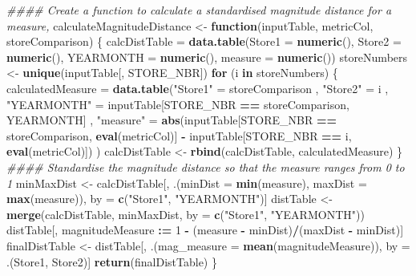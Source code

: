 \documentclass[
]{article}
\newenvironment{Shaded}{\begin{snugshade}}{\end{snugshade}}
\newcommand{\CommentTok}[1]{\textcolor[rgb]{0.56,0.35,0.01}{\textit{#1}}}
\newcommand{\ControlFlowTok}[1]{\textcolor[rgb]{0.13,0.29,0.53}{\textbf{#1}}}
\newcommand{\DataTypeTok}[1]{\textcolor[rgb]{0.13,0.29,0.53}{#1}}
\newcommand{\DecValTok}[1]{\textcolor[rgb]{0.00,0.00,0.81}{#1}}
\newcommand{\ErrorTok}[1]{\textcolor[rgb]{0.64,0.00,0.00}{\textbf{#1}}}
\newcommand{\KeywordTok}[1]{\textcolor[rgb]{0.13,0.29,0.53}{\textbf{#1}}}
\newcommand{\NormalTok}[1]{#1}
\newcommand{\OperatorTok}[1]{\textcolor[rgb]{0.81,0.36,0.00}{\textbf{#1}}}
\newcommand{\StringTok}[1]{\textcolor[rgb]{0.31,0.60,0.02}{#1}}
\begin{document}
\begin{Shaded}
\begin{Highlighting}[]
{{{\CommentTok{#### Create a function to calculate a standardised magnitude distance for a measure,}
\NormalTok{calculateMagnitudeDistance <-}\StringTok{ }\ControlFlowTok{function}\NormalTok{(inputTable, metricCol, storeComparison) \{}
\NormalTok{  calcDistTable =}\StringTok{ }\KeywordTok{data.table}\NormalTok{(}\DataTypeTok{Store1 =} \KeywordTok{numeric}\NormalTok{(), }\DataTypeTok{Store2 =} \KeywordTok{numeric}\NormalTok{(), }\DataTypeTok{YEARMONTH =}
                               \KeywordTok{numeric}\NormalTok{(), }\DataTypeTok{measure =} \KeywordTok{numeric}\NormalTok{())}
\NormalTok{  storeNumbers <-}\StringTok{ }\KeywordTok{unique}\NormalTok{(inputTable[, STORE_NBR])}
  \ControlFlowTok{for}\NormalTok{ (i }\ControlFlowTok{in}\NormalTok{ storeNumbers) \{}
\NormalTok{    calculatedMeasure =}\StringTok{ }\KeywordTok{data.table}\NormalTok{(}\StringTok{"Store1"}\NormalTok{ =}\StringTok{ }\NormalTok{storeComparison}
\NormalTok{                                   , }\StringTok{"Store2"}\NormalTok{ =}\StringTok{ }\NormalTok{i}
\NormalTok{                                   , }\StringTok{"YEARMONTH"}\NormalTok{ =}\StringTok{ }\NormalTok{inputTable[STORE_NBR }\OperatorTok{==}
\StringTok{                                                                }\NormalTok{storeComparison, YEARMONTH]}
\NormalTok{                                   , }\StringTok{"measure"}\NormalTok{ =}\StringTok{ }\KeywordTok{abs}\NormalTok{(inputTable[STORE_NBR }\OperatorTok{==}
\StringTok{                                                                  }\NormalTok{storeComparison, }\KeywordTok{eval}\NormalTok{(metricCol)]}
                                                     \OperatorTok{-}\StringTok{ }\NormalTok{inputTable[STORE_NBR }\OperatorTok{==}\StringTok{ }\NormalTok{i,}
                                                                  \KeywordTok{eval}\NormalTok{(metricCol)])}
\NormalTok{    )}
\NormalTok{    calcDistTable <-}\StringTok{ }\KeywordTok{rbind}\NormalTok{(calcDistTable, calculatedMeasure)}
\NormalTok{  \}}
  \CommentTok{#### Standardise the magnitude distance so that the measure ranges from 0 to 1}
\NormalTok{  minMaxDist <-}\StringTok{ }\NormalTok{calcDistTable[, .(}\DataTypeTok{minDist =} \KeywordTok{min}\NormalTok{(measure), }\DataTypeTok{maxDist =} \KeywordTok{max}\NormalTok{(measure)),}
\NormalTok{                              by =}\StringTok{ }\KeywordTok{c}\NormalTok{(}\StringTok{"Store1"}\NormalTok{, }\StringTok{"YEARMONTH"}\NormalTok{)]}
\NormalTok{  distTable <-}\StringTok{ }\KeywordTok{merge}\NormalTok{(calcDistTable, minMaxDist, }\DataTypeTok{by =} \KeywordTok{c}\NormalTok{(}\StringTok{"Store1"}\NormalTok{, }\StringTok{"YEARMONTH"}\NormalTok{))}
\NormalTok{  distTable[, magnitudeMeasure }\OperatorTok{:}\ErrorTok{=}\StringTok{ }\DecValTok{1} \OperatorTok{-}\StringTok{ }\NormalTok{(measure }\OperatorTok{-}\StringTok{ }\NormalTok{minDist)}\OperatorTok{/}\NormalTok{(maxDist }\OperatorTok{-}\StringTok{ }\NormalTok{minDist)]}
\NormalTok{  finalDistTable <-}\StringTok{ }\NormalTok{distTable[, .(}\DataTypeTok{mag_measure =} \KeywordTok{mean}\NormalTok{(magnitudeMeasure)), by =}
\StringTok{                                }\NormalTok{.(Store1, Store2)]}
  \KeywordTok{return}\NormalTok{(finalDistTable)}
\NormalTok{\}}

}}}
\end{Highlighting}
\end{Shaded}
\end{document}
